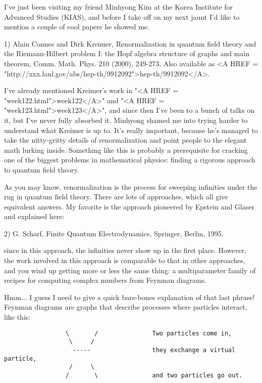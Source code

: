 


I've just been visiting my friend Minhyong Kim at the Korea Institute
for Advanced Studies (KIAS), and before I take off on my next jaunt I'd 
like to mention a couple of cool papers he showed me. 

1) Alain Connes and Dirk Kreimer, Renormalization in quantum field 
theory and the Riemann-Hilbert problem I: the Hopf algebra structure 
of graphs and main theorem, Comm. Math. Phys. 210 (2000), 249-273.
Also available as <A HREF = "http://xxx.lanl.gov/abs/hep-th/9912092">hep-th/9912092</A>.

I've already mentioned Kreimer's work in "<A HREF = "week122.html">week122</A>" 
and "<A HREF = "week123.html">week123</A>", 
and since then I've been to a bunch of talks on it, but I've never 
fully absorbed it.  Minhyong shamed me into trying harder to 
understand what Kreimer is up to.  It's really important, because
he's managed to take the nitty-gritty details of renormalization
and point people to the elegant math lurking inside.  Something like 
this is probably a prerequisite for cracking one of the biggest 
problems in mathematical physics: finding a rigorous approach to 
quantum field theory. 
 
As you may know, renormalization is the process for sweeping
infinities under the rug in quantum field theory.  There are 
lots of approaches, which all give equivalent answers.   My
favorite is the approach pioneered by Epstein and Glaser and 
explained here:

2) G. Scharf, Finite Quantum Electrodynamics, Springer, Berlin, 1995. 

since in this approach, the infinities never show up in the first 
place.  However, the work involved in this approach is comparable 
to that in other approaches, and you wind up getting more or less
the same thing: a multiparameter family of recipes for computing 
complex numbers from Feynman diagrams.  

Hmm... I guess I need to give a quick bare-bones explanation of
that last phrase!  Feynman diagrams are graphs that describe 
processes where particles interact, like this:

\begin{verbatim}
                 \       /               Two particles come in,
                  \     / 
                   -----                 they exchange a virtual particle,
                  /     \
                 /       \               and two particles go out.
\end{verbatim}
    
